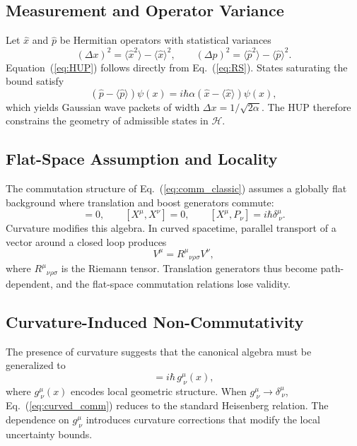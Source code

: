 \documentclass[11pt,oneside]{book}
\numberwithin{equation}{chapter}
\begin{document}
\subsection*{Measurement and Operator Variance}

Let $\hat{x}$ and $\hat{p}$ be Hermitian operators with statistical variances
\begin{equation}
(\Delta x)^2=\langle\hat{x}^2\rangle-\langle\hat{x}\rangle^2,
\qquad
(\Delta p)^2=\langle\hat{p}^2\rangle-\langle\hat{p}\rangle^2.
\end{equation}
Equation~(\ref{eq:HUP}) follows directly from Eq.~(\ref{eq:RS}).  
States saturating the bound satisfy
\begin{equation}
(\hat{p}-\langle\hat{p}\rangle)\psi(x)=i\hbar\alpha(\hat{x}-\langle\hat{x}\rangle)\psi(x),
\end{equation}
which yields Gaussian wave packets of width $\Delta x=1/\sqrt{2\alpha}$.  
The HUP therefore constrains the geometry of admissible states in $\mathcal{H}$.

\subsection*{Flat-Space Assumption and Locality}

The commutation structure of Eq.~(\ref{eq:comm_classic}) assumes a globally flat background where translation and boost generators commute:
\begin{equation}
[P_\mu,P_\nu]=0, \qquad [X^\mu,X^\nu]=0, \qquad [X^\mu,P_\nu]=i\hbar\delta^\mu_{\ \nu}.
\end{equation}
Curvature modifies this algebra.  In curved spacetime, parallel transport of a vector around a closed loop produces
\begin{equation}
[\nabla_\rho,\nabla_\sigma]V^{\mu}=R^{\mu}{}_{\nu\rho\sigma}V^{\nu},
\label{eq:Riemann}
\end{equation}
where $R^{\mu}{}_{\nu\rho\sigma}$ is the Riemann tensor.  
Translation generators thus become path-dependent, and the flat-space commutation relations lose validity.

\subsection*{Curvature-Induced Non-Commutativity}

The presence of curvature suggests that the canonical algebra must be generalized to
\begin{equation}
[X^\mu,P_\nu]=i\hbar\,g^\mu_{\ \nu}(x),
\label{eq:curved_comm}
\end{equation}
where $g^\mu_{\ \nu}(x)$ encodes local geometric structure.  
When $g^\mu_{\ \nu}\!\to\!\delta^\mu_{\ \nu}$, Eq.~(\ref{eq:curved_comm}) reduces to the standard Heisenberg relation.  
The dependence on $g^\mu_{\ \nu}$ introduces curvature corrections that modify the local uncertainty bounds.
\end{document}
